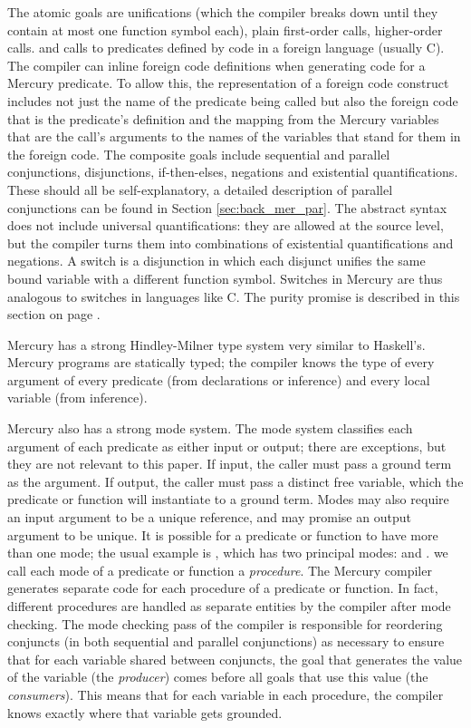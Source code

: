 \noindent
The atomic goals are unifications
(which the compiler breaks down until they contain
at most one function symbol each),
plain first-order calls,
higher-order calls.
and calls to predicates defined by code in a foreign language (usually C).
The compiler can inline foreign code definitions when generating code
for a Mercury predicate.
To allow this, the representation of a foreign code construct includes
not just the name of the predicate being called
but also the foreign code that is the predicate's definition
and the mapping from the Mercury variables that are the call's arguments
to the names of the variables that stand for them in the foreign code.
The composite goals include
sequential and parallel conjunctions,
disjunctions, if-then-elses, negations and existential quantifications.
These should all be self-explanatory,
a detailed description of parallel conjunctions can be found in Section
\ref{sec:back_mer_par}.
The abstract syntax does not include universal quantifications:
they are allowed at the source level,
but the compiler turns them into
combinations of existential quantifications and negations.
A switch is a disjunction in which
each disjunct unifies the same bound variable
with a different function symbol.
Switches in Mercury are thus analogous to switches in languages like C.
The purity promise is described in this section on page
\pageref{page:purity}.

Mercury has a strong Hindley-Milner type system very similar to Haskell's.
Mercury programs are statically typed;
the compiler knows the type of every argument of every predicate
(from declarations or inference) and every local variable (from inference).

Mercury also has a strong mode system.
The mode system classifies each argument of each predicate
as either input or output;
there are exceptions, but they are not relevant to this paper.
If input, the caller must pass a ground term as the argument.
If output, the caller must pass a distinct free variable,
which the predicate or function will instantiate to a ground term.
Modes may also require an input argument to be a unique reference,
and may promise an output argument to be unique.
It is possible for a predicate or function to have more than one mode;
the usual example is , which has two principal modes:
 and .
we call each mode of a predicate or function a \emph{procedure}.
The Mercury compiler generates separate code
for each procedure of a predicate or function.
In fact, different procedures are handled as separate entities by
the compiler after mode checking.
The mode checking pass of the compiler is responsible for
reordering conjuncts (in both sequential and parallel conjunctions)
as necessary to ensure that for each variable shared between conjuncts,
the goal that generates the value of the variable (the \emph{producer})
comes before all goals that use this value (the \emph{consumers}).
This means that for each variable in each procedure,
the compiler knows exactly where that variable gets grounded.

